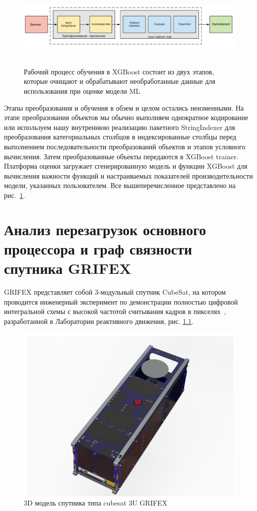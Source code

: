 \documentclass[14pt, a4paper]{../cls/coursework}
\begin{document}
    \begin{figure}[!htbp]
        \centering
        \includegraphics[width=1.0\textwidth]{xgboost_processing}
        ~\caption{Рабочий процесс обучения в XGBoost состоит из двух этапов, которые очищают и обрабатывают необработанные данные для использования при оценке модели ML}
        \label{fig:xgboost_processing}
    \end{figure}

    Этапы преобразования и обучения в обзем и целом остались неизменными.
    На этапе преобразования объектов мы обычно выполняем однократное кодирование или используем нашу внутреннюю реализацию пакетного StringIndexer для преобразования категориальных столбцов в индексированные столбцы перед выполнением последовательности преобразований объектов и этапов условного вычисления.
    Затем преобразованные объекты передаются в XGBoost trainer.
    Платформа оценки загружает сгенерированную модель и функции XGBoost для вычисления важности функций и настраиваемых показателей производительности модели, указанных пользователем.
    Все вышеперечисленное представлено на рис.~\ref{fig:xgboost_processing}.

    \chapter{Анализ перезагрузок основного процессора и граф связности спутника GRIFEX}

    GRIFEX представляет собой 3-модульный спутник CubeSat, на котором проводится инженерный эксперимент по демонстрации полностью цифровой интегральной схемы с высокой частотой считывания кадров в пикселях~\cite{luppen2021introducing}, разработанной в Лаборатории реактивного движения, рис. \ref{fig:grifex_3d_model}.

    \begin{figure}[htbp]
        \centering
        \includegraphics[width=0.5\linewidth]{grifex_3d_model}
        \caption{3D модель спутника типа cubesat 3U GRIFEX}
        \label{fig:grifex_3d_model}
    \end{figure}
\end{document}
